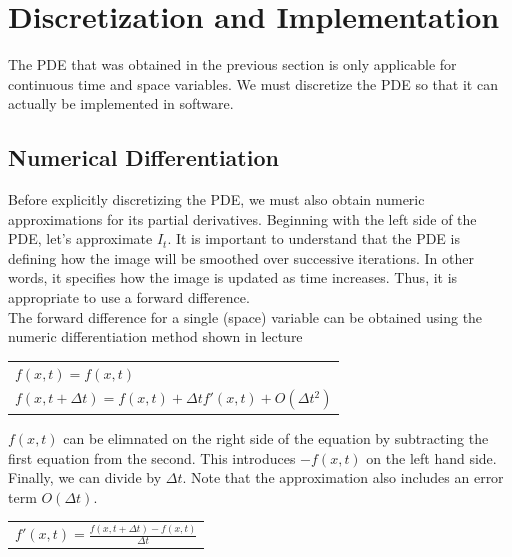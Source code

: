 \documentclass{article}
\begin{document}
  \newpage
  \section{Discretization and Implementation}
  \noindent
  The PDE that was obtained in the previous section is only applicable for continuous
  time and space variables. We must discretize the PDE so that it can actually be implemented in software.\\

  \subsection{Numerical Differentiation}
  \noindent
  Before explicitly discretizing the PDE, we must also obtain numeric approximations for its partial
  derivatives. Beginning with the left side of the PDE, let's approximate $I_{t}$. 
  It is important to understand that the PDE is defining how the image will be smoothed
  over successive iterations. In other words, it specifies how the image is updated as time increases.
  Thus, it is appropriate to use a forward difference.\\

  \noindent
  The forward difference for a single (space) variable can be obtained using the 
  numeric differentiation method shown in lecture
  \begin{center}
    \begin{tabular}{l}
      \vspace{12pt}
      $f(x,t) = f(x,t)$\\
      $f(x,t+\Delta t) = f(x,t) + \Delta t f'(x,t) + O(\Delta t^2)$\\
    \end{tabular}
  \end{center}

  \noindent
  $f(x,t)$ can be elimnated on the right side of the equation by subtracting the 
  first equation from the second. This introduces $-f(x,t)$ on the left hand side.
  Finally, we can divide by $\Delta t$.
  Note that the approximation also includes an error term $O(\Delta t)$.
  \begin{center}
    \begin{tabular}{l}
      $f'(x,t) = \frac{f(x,t+\Delta t) - f(x,t)}{\Delta t}$\\
    \end{tabular}
  \end{center}
\end{document}
